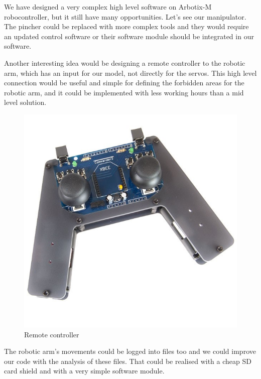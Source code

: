 		\hspace{15pt}We have designed a very complex high level software on Arbotix-M robocontroller, but it still have many opportunities. Let’s see our manipulator. The pincher could be replaced with more complex tools and they would require an updated control software or their software module should be integrated in our software.
		
		Another interesting idea would be designing a remote controller to the robotic arm, which has an input for our model, not directly for the servos. This high level connection would be useful and simple for defining the forbidden areas for the robotic arm, and it could be implemented with less working hours than a mid level solution.
		
		\begin{figure}[H]
			\centering
			\includegraphics[scale=0.6]{./images/remote_controller}
			\caption{Remote controller}
		\end{figure}
		
		The robotic arm’s movements could be logged into files too and we could improve our code with the analysis of these files. That could be realised with a cheap SD card shield and with a very simple software module.
		

